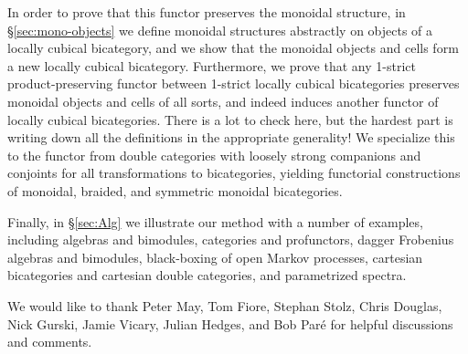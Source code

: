 In order to prove that this functor preserves the monoidal structure, in \S\ref{sec:mono-objects} we define monoidal structures abstractly on objects of a locally cubical bicategory, and we show that the monoidal objects and cells form a new locally cubical bicategory. Furthermore, we prove that any 1-strict product-preserving functor between 1-strict locally cubical bicategories preserves monoidal objects and cells of all sorts, and indeed induces another functor of locally cubical bicategories.
There is a lot to check here, but the hardest part is writing down all the definitions in the appropriate generality! We specialize this to the functor from double categories with loosely strong companions and conjoints for all transformations to bicategories, yielding functorial constructions of monoidal, braided, and symmetric monoidal bicategories.

Finally, in \S\ref{sec:Alg} we illustrate our method with a number of examples, including algebras and bimodules, categories and profunctors, dagger Frobenius algebras and bimodules, black-boxing of open Markov processes, cartesian bicategories and cartesian double categories, and parametrized spectra.

We would like to thank Peter May, Tom Fiore, Stephan Stolz, Chris
Douglas, Nick Gurski, Jamie Vicary, Julian Hedges, and Bob Par\'{e} for helpful discussions and comments.

